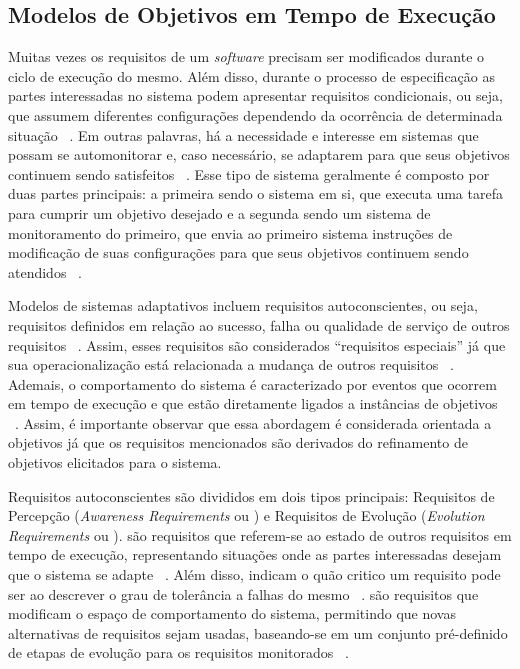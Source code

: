 \subsection{Modelos de Objetivos em Tempo de Execução}
\label{sec-referencial-engenharia-objetivos-runtime}

Muitas vezes os requisitos de um \textit{software} precisam ser modificados durante o ciclo de execução do mesmo. Além disso, durante o processo de especificação as partes interessadas no sistema podem apresentar requisitos condicionais, ou seja, que assumem diferentes configurações dependendo da ocorrência de determinada situação ~\cite{souza2012requirement}. Em outras palavras, há a necessidade e interesse em sistemas que possam se automonitorar e, caso necessário, se adaptarem para que seus objetivos continuem sendo satisfeitos ~\cite{dalpiaz2013runtime}. Esse tipo de sistema geralmente é composto por duas partes principais: a primeira sendo o sistema em si, que executa uma tarefa para cumprir um objetivo desejado e a segunda sendo um sistema de monitoramento do primeiro, que envia ao primeiro sistema instruções de modificação de suas configurações para que seus objetivos continuem sendo atendidos ~\cite{souza2013awareness}. 

Modelos de sistemas adaptativos incluem requisitos autoconscientes, ou seja, requisitos definidos em relação ao sucesso, falha ou qualidade de serviço de outros requisitos ~\cite{souza2013awareness}. Assim, esses requisitos são considerados ``requisitos especiais'' já que sua operacionalização está relacionada a mudança de outros requisitos ~\cite{souza2012requirement}. Ademais, o comportamento do sistema é caracterizado por eventos que ocorrem em tempo de execução e que estão diretamente ligados a instâncias de objetivos ~\cite{dalpiaz2013runtime}. Assim, é importante observar que essa abordagem é considerada orientada a objetivos já que os requisitos mencionados são derivados do refinamento de objetivos elicitados para o sistema.

Requisitos autoconscientes são divididos em dois tipos principais: Requisitos de Percepção (\textit{Awareness Requirements} ou \awreqs) e Requisitos de Evolução (\textit{Evolution Requirements} ou \evoreqs). \awreqs são requisitos que referem-se ao estado de outros requisitos em tempo de execução, representando situações onde as partes interessadas desejam que o sistema se adapte ~\cite{souza2012requirement}. Além disso, indicam o quão critico um requisito pode ser ao descrever o grau de tolerância a falhas do mesmo ~\cite{souza2012requirement}. \evorqs são requisitos que modificam o espaço de comportamento do sistema, permitindo que novas alternativas de requisitos sejam usadas, baseando-se em um conjunto pré-definido de etapas de evolução para os requisitos monitorados ~\cite{souza2012requirement}. 


